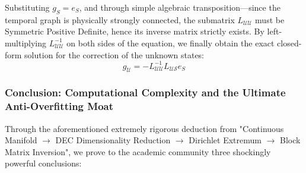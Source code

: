 \documentclass{article}
\begin{document}
Substituting $g_S = e_S$, and through simple algebraic transposition---since the temporal graph is physically strongly connected, the submatrix $L_{\mathcal{UU}}$ must be Symmetric Positive Definite, hence its inverse matrix strictly exists. By left-multiplying $L_{\mathcal{UU}}^{-1}$ on both sides of the equation, we finally obtain the exact closed-form solution for the correction of the unknown states:
\begin{equation}
g_{\mathcal{U}} = -L_{\mathcal{UU}}^{-1} L_{\mathcal{US}} e_S
\end{equation}

\subsubsection{Conclusion: Computational Complexity and the Ultimate Anti-Overfitting Moat}

Through the aforementioned extremely rigorous deduction from "Continuous Manifold $\rightarrow$ DEC Dimensionality Reduction $\rightarrow$ Dirichlet Extremum $\rightarrow$ Block Matrix Inversion", we prove to the academic community three shockingly powerful conclusions:
\end{document}
